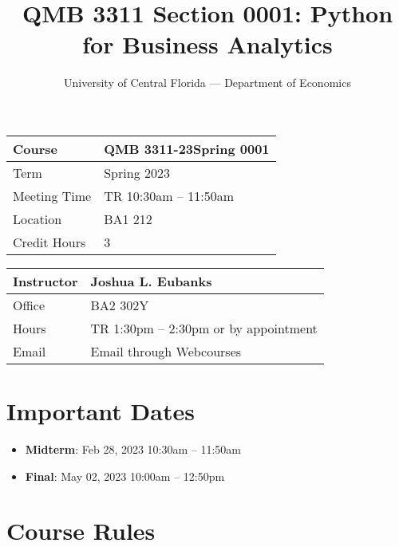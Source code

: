 \documentclass[11pt]{paper}
\begin{document}
\title{QMB 3311 Section 0001: Python for Business Analytics}
\author{University of Central Florida --- Department of Economics}

\maketitle
\hrulefill

\begin{table}[!htb]
    \begin{minipage}{.5\linewidth}
      \centering
 \begin{tabular}{| l | l |}\hline
 Course & QMB 3311-23Spring 0001 \\\hline
 Term & Spring 2023 \\\hline
 Meeting Time & TR 10:30am -- 11:50am\\\hline
 Location & BA1 212\\\hline
 Credit Hours & 3 \\\hline
\end{tabular}
    \end{minipage}%
    \begin{minipage}{.5\linewidth}
      \centering
\begin{tabular}{| l | l |}\hline
 Instructor & Joshua L. Eubanks \\\hline
 Office & BA2 302Y \\\hline
 Hours & TR 1:30pm -- 2:30pm or by appointment \\\hline
 Email & Email through Webcourses \\\hline
\end{tabular}
    \end{minipage} 
\end{table}




\section*{Important Dates}

\begin{itemize}
  \item \textbf{Midterm}: Feb 28, 2023 10:30am -- 11:50am
  \item \textbf{Final}: May 02, 2023 10:00am -- 12:50pm
\end{itemize}


\tableofcontents

\newpage

\section{Course Rules}
\end{document}
